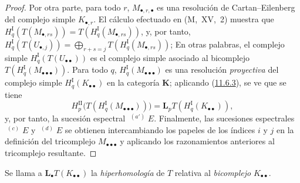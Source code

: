 \begin{proof}
Por otra parte, para todo $r$, $M_{\bullet,r,\bullet}$ es una
resolución de Cartan--Eilenberg del complejo simple $K_{\bullet,r}$.
El cálculo efectuado en (M,~XV,~2) muestra que
$H_q^{\mathrm I}(T(M_{\bullet,rs}))=T(H_q^{\mathrm I}(M_{\bullet,rs}))$,
y, por tanto,
$H_q^{\mathrm I}(T(U_{\bullet,j}))=\bigoplus_{r+s=j}T(H_q^{\mathrm I}(M_{\bullet,rs}))$;
En otras palabras, el complejo simple
$H_q^{\mathrm I}(T(U_{\bullet\bullet}))$ es el complejo simple
asociado al bicomplejo
$T(H_q^{\mathrm I}(M_{\bullet\bullet\bullet}))$.
Para todo $q$, $H_q^{\mathrm I}(M_{\bullet\bullet\bullet})$ es una resolución \emph{proyectiva} del complejo simple $H_q^{\mathrm I}(K_{\bullet\bullet})$ en la categoría $\boldsymbol{K}$; aplicando (\hyperref[0.11.6.3-fr]{11.6.3}), se ve que se tiene
\[
H_p^{\mathrm{II}}
\bigl(T(H_q^{\mathrm I}(M_{\bullet\bullet\bullet}))\bigr)
=\mathbf{L}_pT(H_q^{\mathrm I}(K_{\bullet\bullet})),
\]
y, por tanto, la sucesión espectral $\mathop{}^{(a')}E$.
Finalmente, las sucesiones espectrales $\mathop{}^{(c)}E$ y
$\mathop{}^{(d)}E$ se obtienen intercambiando los papeles de los
índices $i$ y $j$ en la definición del tricomplejo
$M_{\bullet\bullet\bullet}$ y aplicando los razonamientos anteriores al
tricomplejo resultante.
\end{proof}

Se llama a $\mathbf{L}_\bullet T(K_{\bullet\bullet})$ la \emph{hiperhomología} de
$T$ relativa al \emph{bicomplejo} $K_{\bullet\bullet}$.

